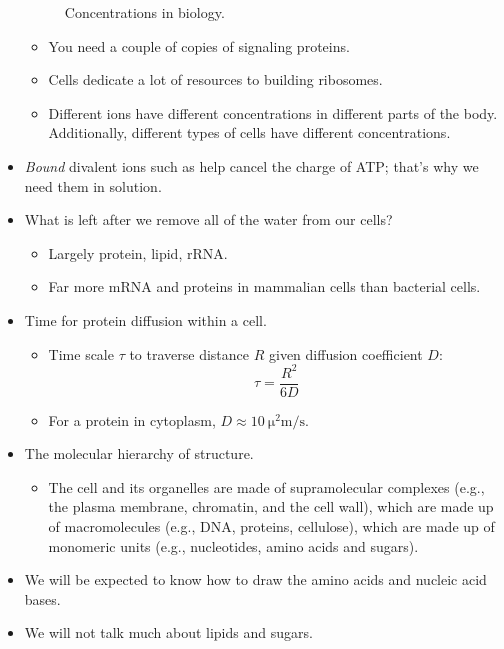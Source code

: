 \documentclass[../notes.tex]{subfiles}
\begin{document}
\begin{itemize}
\begin{figure}[h!]
        \caption{Concentrations in biology.}
        \label{fig:bioConcentrations}
    \end{figure}
    \begin{itemize}
        \item You need a couple of copies of signaling proteins.
        \item Cells dedicate a lot of resources to building ribosomes.
        \item Different ions have different concentrations in different parts of the body. Additionally, different types of cells have different concentrations.
    \end{itemize}
    \item \emph{Bound} divalent ions such as  help cancel the charge of ATP; that's why we need them in solution.
    \item What is left after we remove all of the water from our cells?
    \begin{itemize}
        \item Largely protein, lipid, rRNA.
        \item Far more mRNA and proteins in mammalian cells than bacterial cells.
    \end{itemize}
    \item Time for protein diffusion within a cell.
    \begin{itemize}
        \item Time scale $\tau$ to traverse distance $R$ given diffusion coefficient $D$:
        \begin{equation*}
            \tau = \frac{R^2}{6D}
        \end{equation*}
        \item For a protein in cytoplasm, $D\approx\SI[per-mode=symbol]{10}{\square\micro\meter\per\second}$.
    \end{itemize}
    \item The molecular hierarchy of structure.
    \begin{itemize}
        \item The cell and its organelles are made of supramolecular complexes (e.g., the plasma membrane, chromatin, and the cell wall), which are made up of macromolecules (e.g., DNA, proteins, cellulose), which are made up of monomeric units (e.g., nucleotides, amino acids and sugars).
    \end{itemize}
    \item We will be expected to know how to draw the amino acids and nucleic acid bases.
    \item We will not talk much about lipids and sugars.

\end{itemize}
\end{document}
